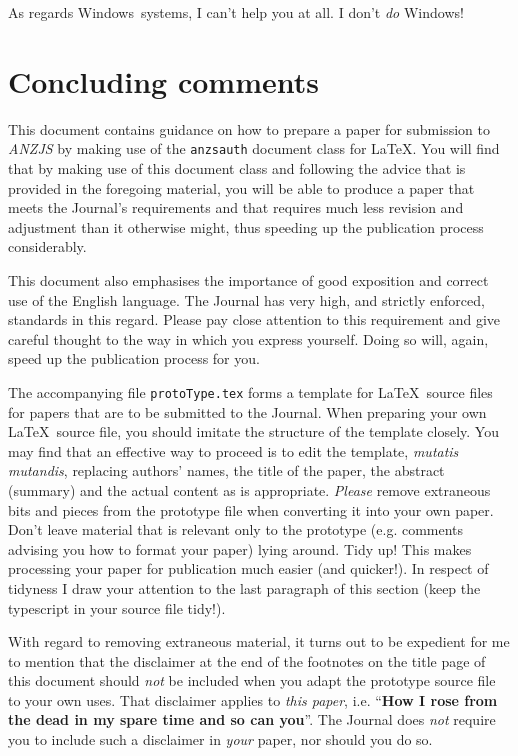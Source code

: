 \documentclass[times, doublespace]{anzsauth}
\begin{document}
As regards Windows\texttrademark\ systems, I can't help you at
all.  I don't \emph{do} Windows\texttrademark!

\section{Concluding comments}
\label{sec:concComm}

This document contains guidance on how to prepare a paper for
submission to \textit{ANZJS} by making use of the \texttt{anzsauth}
document class for \LaTeX.  You will find that by making use of this
document class and following the advice that is provided in the
foregoing material, you will be able to produce a paper that meets
the Journal's requirements and that requires much less revision and
adjustment than it otherwise might, thus speeding up the publication
process considerably.

This document also emphasises the importance of good exposition and
correct use of the English language.  The Journal has very high,
and strictly enforced, standards in this regard.  Please pay close
attention to this requirement and give careful thought to the way
in which you express yourself.  Doing so will, again, speed up the
publication process for you.

The accompanying file \texttt{protoType.tex} forms a template for
\LaTeX\ source files for papers that are to be submitted to the
Journal.  When preparing your own \LaTeX\ source file, you should
imitate the structure of the template closely.  You may find that an
effective way to proceed is to edit the template, \textit{mutatis
mutandis}, replacing authors' names, the title of the paper,
the abstract (summary) and the actual content as is appropriate.
\emph{Please} remove extraneous bits and pieces from the prototype
file when converting it into your own paper.  Don't leave material
that is relevant only to the prototype (e.g. comments advising
you how to format your paper) lying around.  Tidy up!  This makes
processing your paper for publication much easier (and quicker!).
In respect of tidyness I draw your attention to the last paragraph
of this section (keep the typescript in your source file tidy!).

With regard to removing extraneous material, it turns out to be
expedient for me to mention that the disclaimer at the end of the
footnotes on the title page of this document should \emph{not} be
included when you adapt the prototype source file to your own uses.
That disclaimer applies to \emph{this paper}, i.e. ``\textbf{How I
rose from the dead in my spare time and so can you}''.  The Journal
does \emph{not} require you to include such a disclaimer in
\emph{your} paper, nor should you do so.
\end{document}
